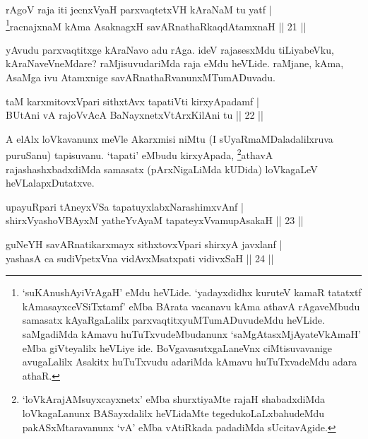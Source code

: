 
\begin{shl}
rAgoV raja iti jecnxVyaH parxvaqtetxVH kAraNaM tu yatf  | \\
\footnote{`suKAnushAyiVrAgaH' eMdu heVLide. `yadayxdidhx kuruteV kamaR tatatxtf kAmasayxceVSiTxtamf' eMba BArata 
vacanavu kAma athavA rAgaveMbudu samasatx kAyaRgaLalilx 
parxvaqtitxyuMTumADuvudeMdu heVLide. saMgadiMda kAmavu 
huTuTxvudeMbudanunx `saMgAtasxMjAyateVkAmaH' eMba giVteyalilx heVLiye 
ide. BoVgavasutxgaLaneVnx ciMtisuvavanige avugaLalilx Asakitx 
huTuTxvudu adariMda kAmavu huTuTxvadeMdu adara athaR.}racnajxnaM kAma AsaknagxH savARnathaRkaqdAtamxnaH \hfill ||  21 || 
\end{shl}

\begin{artha} 
yAvudu parxvaqtitxge kAraNavo adu rAga. ideV rajasesxMdu tiLiyabeVku, 
kAraNaveVneMdare? raMjisuvudariMda raja eMdu heVLide. raMjane, kAma, 
AsaMga ivu Atamxnige savARnathaRvanunxMTumADuvadu.
\end{artha}


\begin{shl}
taM karxmitovxVpari sithxtAvx tapatiVti kirxyApadamf | \\
BUtAni vA rajoVvAcA BaNayxnetxV\s tArxKilAni tu \hfill ||  22 || 
\end{shl}

\begin{artha} 
A elAlx loVkavanunx meVle Akarxmisi niMtu (I sUyaRmaMDaladalilxruva 
puruSanu) tapisuvanu. `tapati' eMbudu kirxyApada, 
\footnote{`loVkArajAMsuyxcayxnetx' eMba shurxtiyaMte rajaH 
shabadxdiMda loVkagaLanunx BASayxdalilx heVLidaMte 
tegedukoLaLxbahudeMdu pakASxMtaravanunx `vA' eMba vAtiRkada padadiMda 
sUcitavAgide.}athavA 
rajashashxbadxdiMda samasatx (pArxNigaLiMda kUDida) loVkagaLeV heVLalapxDutatxve.
\end{artha}

\begin{shl}
upayuRpari tAneyxVSa tapatuyxlabxNarashimxvAnf | \\
shirxVyashoVBAyxM yatheYvAyaM tapateyxVvamupAsakaH \hfill ||  23 ||
\end{shl}

\begin{shl}
guNeYH savARnatikarxmayx sithxtovxVpari shirxyA javxlanf | \\
yashasA ca sudiVpetxVna vidAvxMsatxpati vidivxSaH \hfill ||  24 || 
\end{shl}

